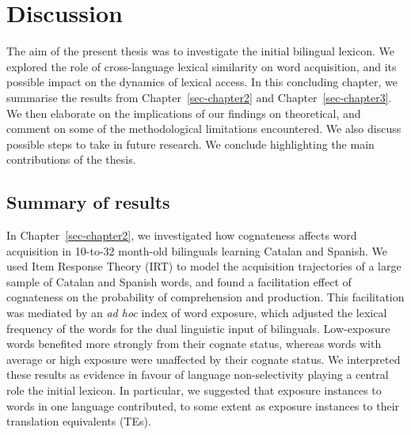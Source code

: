 \documentclass[
  12pt,
  b5paperpaper,
  twoside]{scrreprt}
\begin{document}
\newpage{}


\hypertarget{sec-discussion}{%
\chapter{Discussion}\label{sec-discussion}}

The aim of the present thesis was to investigate the initial bilingual
lexicon. We explored the role of cross-language lexical similarity on
word acquisition, and its possible impact on the dynamics of lexical
access. In this concluding chapter, we summarise the results from
Chapter~\ref{sec-chapter2} and Chapter~\ref{sec-chapter3}. We then
elaborate on the implications of our findings on theoretical, and
comment on some of the methodological limitations encountered. We also
discuss possible steps to take in future research. We conclude
highlighting the main contributions of the thesis.

\hypertarget{summary-of-results}{%
\section{Summary of results}\label{summary-of-results}}

In Chapter~\ref{sec-chapter2}, we investigated how cognateness affects
word acquisition in 10-to-32 month-old bilinguals learning Catalan and
Spanish. We used Item Response Theory (IRT) to model the acquisition
trajectories of a large sample of Catalan and Spanish words, and found a
facilitation effect of cognateness on the probability of comprehension
and production. This facilitation was mediated by an \emph{ad hoc} index
of word exposure, which adjusted the lexical frequency of the words for
the dual linguistic input of bilinguals. Low-exposure words benefited
more strongly from their cognate status, whereas words with average or
high exposure were unaffected by their cognate status. We interpreted
these results as evidence in favour of language non-selectivity playing
a central role the initial lexicon. In particular, we suggested that
exposure instances to words in one language contributed, to some extent
as exposure instances to their translation equivalents (TEs).
\end{document}
